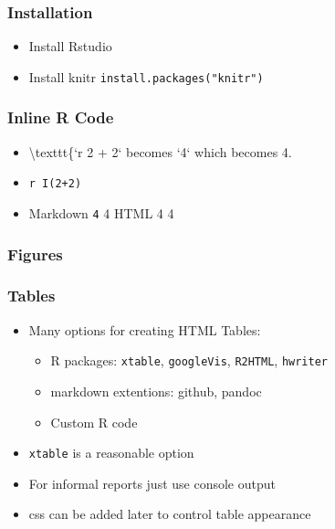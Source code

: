 \begin{frame}[fragile]\frametitle{Installation}

\begin{itemize}
\item
  Install Rstudio
\item
  Install knitr \texttt{install.packages("knitr")}
\end{itemize}

\end{frame}

\begin{frame}[fragile]\frametitle{Inline R Code}

\begin{itemize}
\item
  \textbackslash{}texttt\{`r 2 + 2` becomes `4` which becomes 4.
\item
  \texttt{r I(2+2)}
\item
  Markdown \texttt{4} 4 HTML 4 4
\end{itemize}

\end{frame}

\begin{frame}\frametitle{Figures}

\end{frame}

\begin{frame}[fragile]\frametitle{Tables}

\begin{itemize}
\item
  Many options for creating HTML Tables:

  \begin{itemize}
  \item
    R packages: \texttt{xtable}, \texttt{googleVis}, \texttt{R2HTML},
    \texttt{hwriter}
  \item
    markdown extentions: github, pandoc
  \item
    Custom R code
  \end{itemize}
\item
  \texttt{xtable} is a reasonable option
\item
  For informal reports just use console output
\item
  css can be added later to control table appearance
\end{itemize}

\end{frame}

